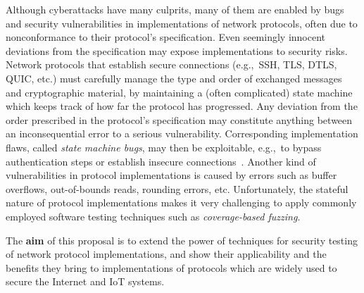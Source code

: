 \documentclass[11pt]{article}
\newcommand{\eg}{e.\/g.,\ }
\begin{document}
Although cyberattacks have many culprits, many of them are enabled by bugs and
security vulnerabilities in implementations of network protocols, often due to
nonconformance to their protocol's specification. Even seemingly innocent
deviations from the specification may expose implementations to security
risks. Network protocols that establish secure connections (\eg SSH, TLS,
DTLS, QUIC, etc.) must carefully manage the type and order of exchanged
messages and cryptographic material, by maintaining a (often complicated)
state machine which keeps track of how far the protocol has progressed. Any
deviation from the order prescribed in the protocol's specification may
constitute anything between an inconsequential error to a serious
vulnerability. Corresponding implementation flaws, called \emph{state machine
bugs}, may then be exploitable, \eg to bypass authentication steps or
establish insecure
connections~\cite{MessyTLS@CACM-17,ruiter2015,somorovsky2016,DTLS@USENIX-20}.
Another kind of vulnerabilities in protocol implementations is caused by
errors such as buffer overflows, out-of-bounds reads, rounding errors, etc.
Unfortunately, the stateful nature of protocol implementations makes it very
challenging to apply commonly employed software testing techniques such as
\emph{coverage-based fuzzing}.

The \textbf{aim} of this proposal is to extend the power of techniques for
security testing of network protocol implementations, and show their
applicability and the benefits they bring to implementations of protocols
which are widely used to secure the Internet and IoT systems.
\end{document}

